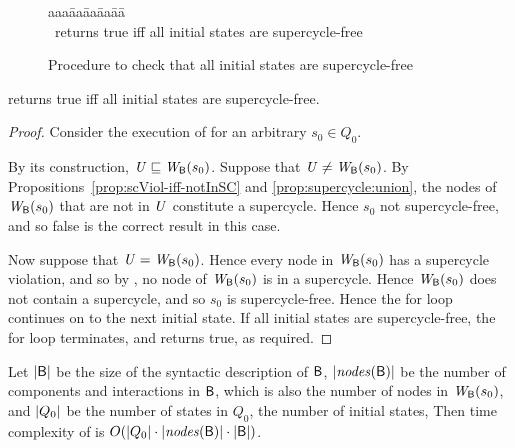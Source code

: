 \begin{figure}[ht]
\setcounter{lctr}{0}
\begin{tabbing}\label{alg:compute-scViol}
aaa\= aa\= aa\= aa\= aa\=\kill
{}\\
\cmnt\ returns true iff all initial states are supercycle-free\\
\lio{\ENDFOR;}
\end{tabbing}
\caption{Procedure to check that all initial states are supercycle-free}
\label{fig:checkInitSCFree}
\end{figure}


\begin{proposition}
 returns true iff all initial states are supercycle-free.
\end{proposition}
%
\begin{proof}
Consider the execution of  for an arbitrary $s_0 \in Q_0$.

By its construction, $\mathit{U} \sqsubseteq \mathit{W}_{\mathsf{B}}({s_0})$.
Suppose that $\mathit{U} \ne  \mathit{W}_{\mathsf{B}}({s_0})$.
By Propositions~\ref{prop:scViol-iff-notInSC} and
\ref{prop:supercycle:union}, the nodes of $\mathit{W}_{\mathsf{B}}({s_0})$ that are not in $\mathit{U}$ constitute a supercycle.
Hence $s_0$ not supercycle-free, and so false is the correct result in this case.

Now suppose that $\mathit{U} = \mathit{W}_{\mathsf{B}}({s_0})$. Hence every node in $\mathit{W}_{\mathsf{B}}({s_0})$ has a supercycle violation, and so
by , no node of $\mathit{W}_{\mathsf{B}}({s_0})$ is in a 
supercycle. Hence  $\mathit{W}_{\mathsf{B}}({s_0})$ does not contain a supercycle, and so
$s_0$ is supercycle-free.
Hence the for loop continues on to the next initial state.
If all initial states are supercycle-free, the for loop terminates, and
 returns true, as required.
\end{proof}


Let
$|\mathsf{B}|$ be the size of the syntactic description of $\mathsf{B}$, 
$|\mathit{nodes}(\mathsf{B})|$ be the number of components and interactions in $\mathsf{B}$, which is also the number of nodes in $\mathit{W}_{\mathsf{B}}({s_0})$, and
$|Q_0|$ be the number of states in $Q_0$, \ie the number of initial states,
%
Then time complexity of  is 
$O(|Q_0| \cdot |\mathit{nodes}(\mathsf{B})| \cdot |\mathsf{B}|)$.


